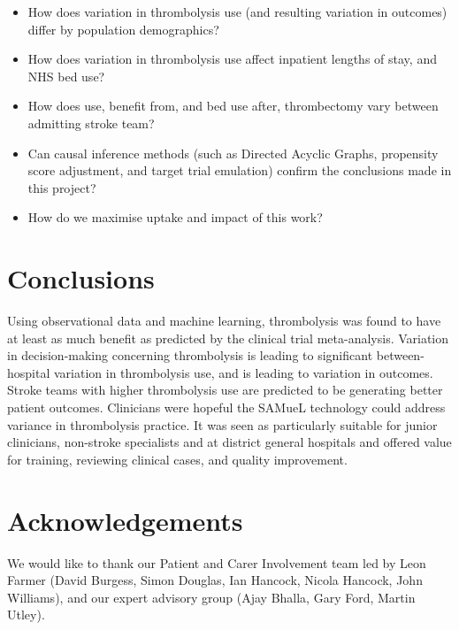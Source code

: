 \begin{itemize}

    \item How does variation in thrombolysis use (and resulting variation in outcomes) differ by population demographics?

    \item How does variation in thrombolysis use affect inpatient lengths of stay, and NHS bed use?

    \item How does use, benefit from, and bed use after, thrombectomy vary between admitting stroke team?

    \item Can causal inference methods (such as Directed Acyclic Graphs, propensity score adjustment, and target trial emulation) confirm the conclusions made in this project?

    \item How do we maximise uptake and impact of this work?
    
\end{itemize}


\section{Conclusions}

Using observational data and machine learning, thrombolysis was found to have at least as much benefit as predicted by the clinical trial meta-analysis. Variation in decision-making concerning thrombolysis is leading to significant between-hospital variation in thrombolysis use, and is leading to variation in outcomes. Stroke teams with higher thrombolysis use are predicted to be generating better patient outcomes. Clinicians were hopeful the SAMueL technology could address variance in thrombolysis practice. It was seen as particularly suitable for junior clinicians, non-stroke specialists and at district general hospitals and offered value for training, reviewing clinical cases, and quality improvement.

\section{Acknowledgements}

We would like to thank our Patient and Carer Involvement team led by Leon Farmer (David Burgess, Simon Douglas, Ian Hancock, Nicola Hancock, John Williams), and our expert advisory group (Ajay Bhalla, Gary Ford, Martin Utley).

